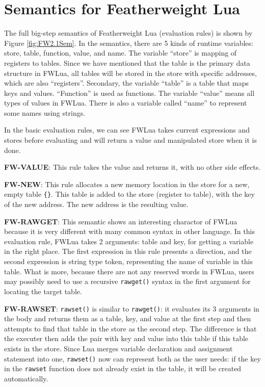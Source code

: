 \section{Semantics for Featherweight Lua}\label{sec: FWLUAsemantic}
The full big-step semantics of Featherweight Lua (evaluation rules) is shown by Figure \ref{fig:FW2.1Sem}. In the semantics, there are 5 kinds of runtime variables: store, table, function, value, and name. The variable ``store'' is mapping of registers to tables. Since we have mentioned that the table is the primary data structure in FWLua, all tables will be stored in the store with specific addresses, which are also ``registers''. Secondary, the variable ``table'' is a table that maps keys and values. ``Function'' is used as functions. The variable ``value'' means all types of values in FWLua. There is also a variable called ``name'' to represent some names using strings.

In the basic evaluation rules, we can see FWLua takes current expressions and stores before evaluating and will return a value and manipulated store when it is done.

{\bf FW-VALUE}: 
This rule takes the value and returns it, with no other side effects.

{\bf FW-NEW}: 
This rule allocates a new memory location in the store for a new, empty table {\tt \{\}}. This table is added to the store (register to table), with the key of the new address.  The new address is the resulting value.

{\bf FW-RAWGET}: 
This semantic shows an interesting charactor of FWLua because it is very different with many common syntax in other language. In this evaluation rule, FWLua takes 2 arguments: table and key, for getting a variable in the right place. The first expression in this rule presents a direction, and the second expression is string type token, representing the name of variable in this table. What is more, because there are not any reserved words in FWLua, users may possibly need to use a recursive {\tt rawget()} syntax in the first argument for locating the target table.

{\bf FW-RAWSET}: 
{\tt rawset()} is similar to {\tt rawget()}: it evaluates its 3 arguments in the body and returns them as a table, key, and value at the first step and then attempts to find that table in the store as the second step. The difference is that the executer then adds the pair with key and value into this table if this table exists in the store. Since Lua merges variable declaration and assignment statement into one, {\tt rawset()} now can represent both as the user needs: if the key in the {\tt rawset} function does not already exist in the table, it will be created automatically.

